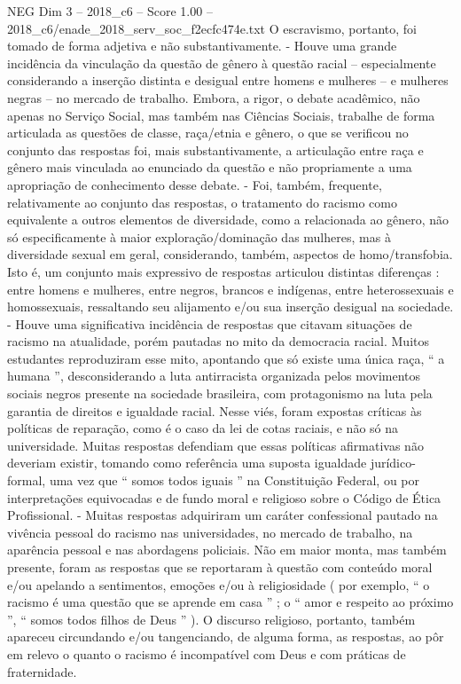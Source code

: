 \begin{textsample}{NEG Dim 3 – 2018\_c6 – Score 1.00 – 2018\_c6/enade\_2018\_serv\_soc\_f2ecfc474e.txt}
O escravismo, portanto, foi tomado de forma adjetiva e não substantivamente. - Houve uma grande incidência da vinculação da questão de gênero à questão racial – especialmente considerando a inserção distinta e desigual entre homens e mulheres – e mulheres negras – no mercado de trabalho.
Embora, a rigor, o debate acadêmico, não apenas no Serviço Social, mas também nas Ciências Sociais, trabalhe de forma articulada as questões de classe, raça/etnia e gênero, o que se verificou no conjunto das respostas foi, mais substantivamente, a articulação entre raça e gênero mais vinculada ao enunciado da questão e não propriamente a uma apropriação de conhecimento desse debate. - Foi, também, frequente, relativamente ao conjunto das respostas, o tratamento do racismo como equivalente a outros elementos de diversidade, como a relacionada ao gênero, não só especificamente à maior exploração/dominação das mulheres, mas à diversidade sexual em geral, considerando, também, aspectos de homo/transfobia.
Isto é, um conjunto mais expressivo de respostas articulou distintas diferenças : entre homens e mulheres, entre negros, brancos e indígenas, entre heterossexuais e homossexuais, ressaltando seu alijamento e/ou sua inserção desigual na sociedade. - Houve uma significativa incidência de respostas que citavam situações de racismo na atualidade, porém pautadas no mito da democracia racial.
Muitos estudantes reproduziram esse mito, apontando que só existe uma única raça, “ a humana ”, desconsiderando a luta antirracista organizada pelos movimentos sociais negros presente na sociedade brasileira, com protagonismo na luta pela garantia de direitos e igualdade racial.
Nesse viés, foram expostas críticas às políticas de reparação, como é o caso da lei de cotas raciais, e não só na universidade.
Muitas respostas defendiam que essas políticas afirmativas não deveriam existir, tomando como referência uma suposta igualdade jurídico-formal, uma vez que “ somos todos iguais ” na Constituição Federal, ou por interpretações equivocadas e de fundo moral e religioso sobre o Código de Ética Profissional. - Muitas respostas adquiriram um caráter confessional pautado na vivência pessoal do racismo nas universidades, no mercado de trabalho, na aparência pessoal e nas abordagens policiais.
Não em maior monta, mas também presente, foram as respostas que se reportaram à questão com conteúdo moral e/ou apelando a sentimentos, emoções e/ou à religiosidade ( por exemplo, “ o racismo é uma questão que se aprende em casa ” ; o “ amor e respeito ao próximo ”, “ somos todos filhos de Deus ” ).
O discurso religioso, portanto, também apareceu circundando e/ou tangenciando, de alguma forma, as respostas, ao pôr em relevo o quanto o racismo é incompatível com Deus e com práticas de fraternidade.

\end{textsample}
